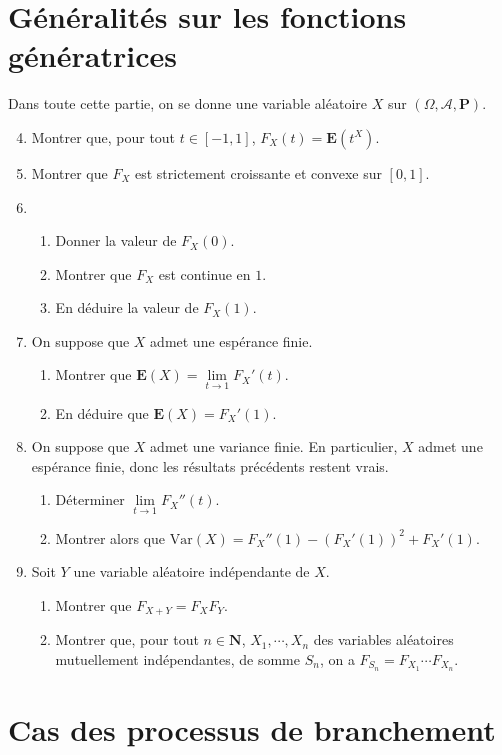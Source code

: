 \documentclass[a4paper,11pt]{article}
\newcommand{\N}{\mathbf{N}}
\renewcommand{\P}{\mathbf{P}}
\newcommand{\E}{\mathbf{E}}
\begin{document}
\section{Généralités sur les fonctions génératrices}
Dans toute cette partie, on se donne une variable aléatoire $X$ sur $(\Omega,\mathcal{A},\P)$.
\begin{enumerate}
\setcounter{enumi}{3}
\item Montrer que, pour tout $t\in[-1,1]$, $F_X(t)=\E(t^X)$.
\item Montrer que $F_X$ est strictement croissante et convexe sur $[0,1]$.
\item \begin{enumerate}
\item Donner la valeur de $F_X(0)$.
\item Montrer que $F_X$ est continue en $1$.
\item En déduire la valeur de $F_X(1)$.
\end{enumerate}
\item On suppose que $X$ admet une espérance finie. 
\begin{enumerate}
\item Montrer que $\E(X)=\lim\limits_{t\to 1}{F_X}'(t)$.
\item En déduire que $\E(X)={F_X}'(1)$.
\end{enumerate}
\item On suppose que $X$ admet une variance finie. En particulier, $X$ admet une espérance finie, donc les résultats précédents restent vrais.
\begin{enumerate}
\item Déterminer $\lim\limits_{t\to 1}{F_X}''(t)$.
\item Montrer alors que $\mathrm{Var}(X)={F_X}''(1)-\left({F_X}'(1)\right)^2+{F_X}'(1)$.
\end{enumerate}
\item Soit $Y$ une variable aléatoire indépendante de $X$. 
\begin{enumerate}
\item Montrer que $F_{X+Y}=F_XF_Y$.
\item Montrer que, pour tout $n\in\N$, $X_1,\cdots,X_n$ des variables aléatoires mutuellement indépendantes, de somme $S_n$, on a $F_{S_n}=F_{X_1}\cdots F_{X_n}$.
\end{enumerate}
\end{enumerate}

\section{Cas des processus de branchement}
\end{document}
